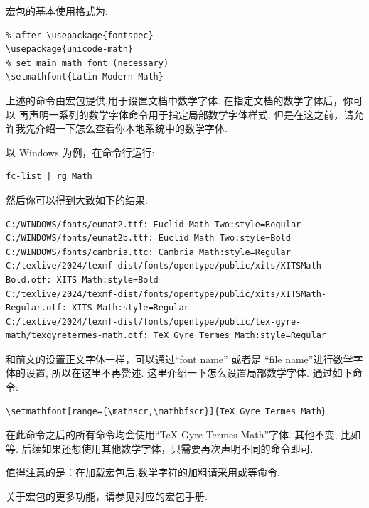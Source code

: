 宏包的基本使用格式为:
\begin{verbatim}
% after \usepackage{fontspec}
\usepackage{unicode-math}
% set main math font (necessary)
\setmathfont{Latin Modern Math}
\end{verbatim}

上述的命令\cmd{\setmathfont}\index{\cmd{\setmathfont}}由宏包提供,用于设置文档中数学字体. 在指定文档的数学字体后，你可以
再声明一系列的数学字体命令用于指定局部数学字体样式. 但是在这之前，请允许我先介绍一下怎么查看你本地系统中的数学字体. 

以 Windows 为例，在命令行运行:
\begin{verbatim}
fc-list | rg Math
\end{verbatim}

然后你可以得到大致如下的结果:
\begin{verbatim}
C:/WINDOWS/fonts/eumat2.ttf: Euclid Math Two:style=Regular
C:/WINDOWS/fonts/eumat2b.ttf: Euclid Math Two:style=Bold
C:/WINDOWS/fonts/cambria.ttc: Cambria Math:style=Regular
C:/texlive/2024/texmf-dist/fonts/opentype/public/xits/XITSMath-Bold.otf: XITS Math:style=Bold
C:/texlive/2024/texmf-dist/fonts/opentype/public/xits/XITSMath-Regular.otf: XITS Math:style=Regular
C:/texlive/2024/texmf-dist/fonts/opentype/public/tex-gyre-math/texgyretermes-math.otf: TeX Gyre Termes Math:style=Regular
\end{verbatim}

和前文的设置正文字体一样，可以通过``font name'' 或者是 ``file name''进行数学字体的设置, 所以在这里不再赘述. 
这里介绍一下怎么设置局部数学字体. 通过如下命令:
\begin{verbatim}
\setmathfont[range={\mathscr,\mathbfscr}]{TeX Gyre Termes Math}
\end{verbatim}

在此命令之后的所有\cmd[F]{\mathscr, \mathbfscr}命令均会使用``TeX Gyre Termes Math''字体. 其他不变, 比如\cmd[F]{\mathrm, \mathbf}等.
后续如果还想使用其他数学字体，只需要再次声明不同的\cmd[F]{\setmathfont}命令即可.

\begin{remark}
值得注意的是：在加载宏包后,数学字符的加粗请采用\cmd[F]{\boldsymbol}或\cmd[F]{\symbf, \symbfit, \symbfup}等命令.
\end{remark}

关于宏包的更多功能，请参见对应的宏包手册. 


